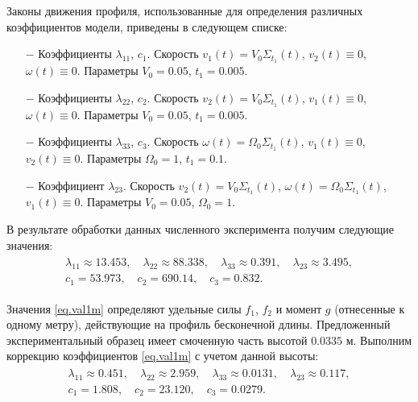 Законы движения профиля, использованные для определения различных коэффициентов модели, приведены в следующем списке:
\begin{itemize}
	\item[$-$] Коэффициенты $\lambda_{11}$, $c_1$. Скорость $v_1(t) = V_0 \Sigma_{t_1}(t)$, $v_2(t) \equiv 0$, $\omega(t) \equiv 0$. Параметры $V_0 = 0.05$, $t_1 = 0.005$.
	\item[$-$] Коэффициенты $\lambda_{22}$, $c_2$. Скорость $v_2(t) = V_0 \Sigma_{t_1}(t)$, $v_1(t) \equiv 0$, $\omega(t) \equiv 0$. Параметры $V_0 = 0.05$, $t_1 = 0.005$.
	\item[$-$] Коэффициенты $\lambda_{33}$, $c_3$. Скорость $\omega(t) = \Omega_0 \Sigma_{t_1}(t)$, $v_1(t) \equiv 0$, $v_2(t) \equiv 0$. Параметры $\Omega_0 = 1$, $t_1 = 0.1$.
	\item[$-$] Коэффициент $\lambda_{23}$. Скорость $v_2(t) = V_0 \Sigma_{t_1}(t)$, $\omega(t) = \Omega_0 \Sigma_{t_1}(t)$, $v_1(t) \equiv 0$. Параметры $V_0 = 0.05$, $\Omega_0 = 1$.
\end{itemize}

В результате обработки данных численного эксперимента получим следующие значения:
\begin{gather}
	\begin{gathered}
		\lambda_{11} \approx 13.453, \quad \lambda_{22} \approx 88.338,\quad \lambda_{33} \approx 0.391,\quad \lambda_{23} \approx 3.495,\\
		c_1 = 53.973,\quad c_2 = 690.14,\quad c_3 = 0.832.
	\end{gathered}\label{eq.val1m}
\end{gather}

Значения \eqref{eq.val1m} определяют удельные силы $f_1$, $f_2$ и момент $g$ (отнесенные к одному метру), действующие на профиль бесконечной длины. Предложенный экспериментальный образец имеет смоченную часть высотой $0.0335$ м. Выполним коррекцию коэффициентов \eqref{eq.val1m} с учетом данной высоты:
\begin{gather}
	\begin{gathered}
		\lambda_{11} \approx 0.451, \quad \lambda_{22} \approx 2.959,\quad \lambda_{33} \approx 0.0131,\quad \lambda_{23} \approx 0.117,\\
		c_1 = 1.808,\quad c_2 = 23.120,\quad c_3 = 0.0279.
	\end{gathered}\label{eq.coeffs1}
\end{gather}


